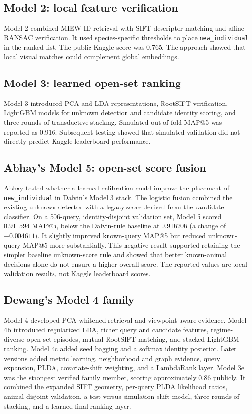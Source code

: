\documentclass[11pt]{article}
\begin{document}
\subsection{Model 2: local feature verification}
Model 2 combined MIEW-ID retrieval with SIFT descriptor matching and affine RANSAC verification. It used species-specific thresholds to place \texttt{new\_individual} in the ranked list. The public Kaggle score was 0.765. The approach showed that local visual matches could complement global embeddings.

\subsection{Model 3: learned open-set ranking}
Model 3 introduced PCA and LDA representations, RootSIFT verification, LightGBM models for unknown detection and candidate identity scoring, and three rounds of transductive stacking. Simulated out-of-fold MAP@5 was reported as 0.916. Subsequent testing showed that simulated validation did not directly predict Kaggle leaderboard performance.

\subsection{Abhay's Model 5: open-set score fusion}
Abhay tested whether a learned calibration could improve the placement of \texttt{new\_individual} in Dalvin's Model 3 stack. The logistic fusion combined the existing unknown detector with a legacy score derived from the candidate classifier. On a 506-query, identity-disjoint validation set, Model 5 scored 0.911594 MAP@5, below the Dalvin-rule baseline at 0.916206 (a change of $-0.004611$). It slightly improved known-query MAP@5 but reduced unknown-query MAP@5 more substantially. This negative result supported retaining the simpler baseline unknown-score rule and showed that better known-animal decisions alone do not ensure a higher overall score. The reported values are local validation results, not Kaggle leaderboard scores.

\subsection{Dewang's Model 4 family}
Model 4 developed PCA-whitened retrieval and viewpoint-aware evidence. Model 4b introduced regularized LDA, richer query and candidate features, regime-diverse open-set episodes, mutual RootSIFT matching, and stacked LightGBM ranking. Model 4c added seed bagging and a softmax identity posterior. Later versions added metric learning, neighborhood and graph evidence, query expansion, PLDA, covariate-shift weighting, and a LambdaRank layer. Model 3e was the strongest verified family member, scoring approximately 0.86 publicly. It combined the expanded SIFT geometry, per-query PLDA likelihood ratios, animal-disjoint validation, a test-versus-simulation shift model, three rounds of stacking, and a learned final ranking layer.
\end{document}
